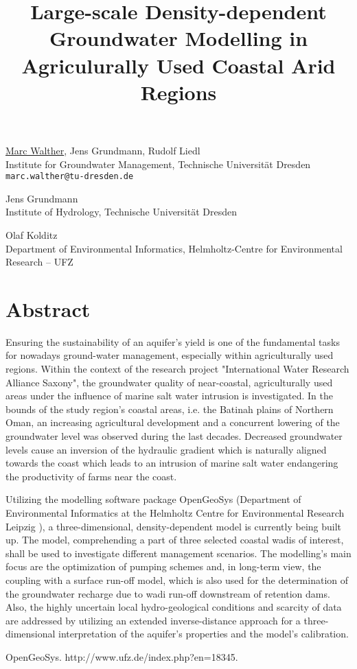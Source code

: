 \title{Large-scale Density-dependent Groundwater Modelling in Agriculurally Used Coastal Arid Regions}
\author{} \institute{}
\maketitle

\begin{center}
{\large \underline{Marc Walther}, Jens Grundmann, Rudolf Liedl}\\
Institute for Groundwater Management, Technische Universit\"at Dresden\\
{\tt marc.walther@tu-dresden.de}\\
\vspace{4mm}

{\large Jens Grundmann}\\
Institute of Hydrology, Technische Universität Dresden\\
\vspace{4mm}

{\large Olaf Kolditz}\\
Department of Environmental Informatics, Helmholtz-Centre for Environmental Research -- UFZ
\end{center}

\section*{Abstract}
Ensuring the sustainability of an aquifer's yield is one of the fundamental tasks for nowadays ground-water management, especially within agriculturally used regions. Within the context of the research project "International Water Research Alliance Saxony", the groundwater quality of near-coastal, agriculturally used areas under the influence of marine salt water intrusion is investigated. In the bounds of the study region's coastal areas, i.e. the Batinah plains of Northern Oman, an increasing agricultural development and a concurrent lowering of the groundwater level was observed during the last decades. Decreased groundwater levels cause an inversion of the hydraulic gradient which is naturally aligned towards the coast which leads to an intrusion of marine salt water endangering the productivity of farms near the coast.

Utilizing the modelling software package OpenGeoSys (Department of Environmental Informatics at the Helmholtz Centre for Environmental Research Leipzig \cite{walther1}), a three-dimensional, density-dependent model is currently being built up. The model, comprehending a part of three selected coastal wadis of interest, shall be used to investigate different management scenarios. The modelling's main focus are the optimization of pumping schemes and, in long-term view, the coupling with a surface run-off model, which is also used for the determination of the groundwater recharge due to wadi run-off downstream of retention dams. Also, the highly uncertain local hydro-geological conditions and scarcity of data are addressed by utilizing an extended inverse-distance approach for a three-dimensional interpretation of the aquifer's properties and the model's calibration.


\begin{thebibliography}{10}
{\sc OpenGeoSys}. {http://www.ufz.de/index.php?en=18345}.
\end{thebibliography}